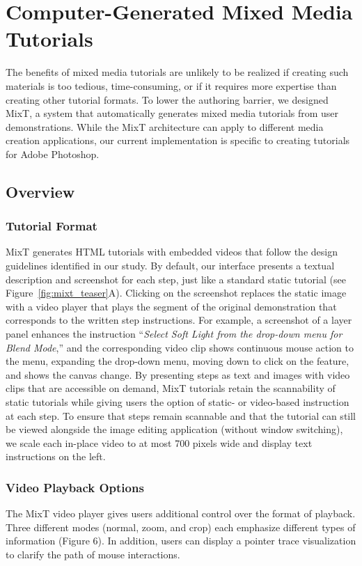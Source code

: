 \section{Computer-Generated Mixed Media Tutorials}

The benefits of mixed media tutorials are unlikely to be realized if creating such materials is too tedious, time-consuming, or if it requires more expertise than creating other tutorial formats. To lower the authoring barrier, we designed MixT, a system that automatically generates mixed media tutorials from user demonstrations. While the MixT architecture can apply to different media creation applications, our current implementation is specific to creating tutorials for Adobe Photoshop.

\subsection{Overview}
\subsubsection{Tutorial Format}
MixT generates HTML tutorials with embedded videos that follow the design guidelines identified in our study. By default, our interface presents a textual description and screenshot for each step, just like a standard static tutorial (see Figure~\ref{fig:mixt_teaser}A). Clicking on the screenshot replaces the static image with a video player that plays the segment of the original demonstration that corresponds to the written step instructions. For example, a screenshot of a layer panel enhances the instruction ``\emph{Select Soft Light from the drop-down menu for Blend Mode},'' and the corresponding video clip shows continuous mouse action to the menu, expanding the drop-down menu, moving down to click on the feature, and shows the canvas change. By presenting steps as text and images with video clips that are accessible on demand, MixT tutorials retain the scannability of static tutorials while giving users the option of static- or video-based instruction at each step. To ensure that steps remain scannable and that the tutorial can still be viewed alongside the image editing application (without window switching), we scale each in-place video to at most 700 pixels wide and display text instructions on the left.

\subsubsection{Video Playback Options }
The MixT video player gives users additional control over the format of playback. Three different modes (normal, zoom, and crop) each emphasize different types of information (Figure 6). In addition, users can display a pointer trace visualization to clarify the path of mouse interactions.

